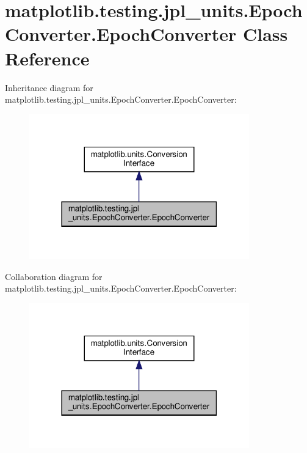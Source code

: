 \hypertarget{classmatplotlib_1_1testing_1_1jpl__units_1_1EpochConverter_1_1EpochConverter}{}\section{matplotlib.\+testing.\+jpl\+\_\+units.\+Epoch\+Converter.\+Epoch\+Converter Class Reference}
\label{classmatplotlib_1_1testing_1_1jpl__units_1_1EpochConverter_1_1EpochConverter}


Inheritance diagram for matplotlib.\+testing.\+jpl\+\_\+units.\+Epoch\+Converter.\+Epoch\+Converter\+:
\nopagebreak
\begin{figure}[H]
\begin{center}
\leavevmode
\includegraphics[width=270pt]{classmatplotlib_1_1testing_1_1jpl__units_1_1EpochConverter_1_1EpochConverter__inherit__graph}
\end{center}
\end{figure}


Collaboration diagram for matplotlib.\+testing.\+jpl\+\_\+units.\+Epoch\+Converter.\+Epoch\+Converter\+:
\nopagebreak
\begin{figure}[H]
\begin{center}
\leavevmode
\includegraphics[width=270pt]{classmatplotlib_1_1testing_1_1jpl__units_1_1EpochConverter_1_1EpochConverter__coll__graph}
\end{center}
\end{figure}
